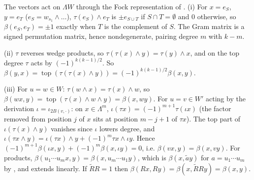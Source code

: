 The vectors act on $\Lambda W$ through the Fock representation of . (i) For $x = e_S$, $y = e_T$ ($e_S = w_{s_1} \wedge \dots$), $\tau(e_S) \wedge e_T$ is $\pm e_{S \cup T}$ if $S \cap T = \emptyset$ and $0$ otherwise, so $\beta(e_S, e_T) = \pm 1$ exactly when $T$ is the complement of $S$. The Gram matrix is a signed permutation matrix, hence nondegenerate, pairing degree $m$ with $k - m$.

(ii) $\tau$ reverses wedge products, so $\tau(\tau(x) \wedge y) = \tau(y) \wedge x$, and on the top degree $\tau$ acts by $(-1)^{k(k-1)/2}$. So $\beta(y, x) = \operatorname{top}(\tau(\tau(x) \wedge y)) = (-1)^{k(k-1)/2}\beta(x, y)$.

(iii) For $u = w \in W$: $\tau(w \wedge x) = \tau(x) \wedge w$, so $\beta(w x, y) = \operatorname{top}(\tau(x) \wedge w \wedge y) = \beta(x, w y)$. For $u = v \in W'$ acting by the derivation $\iota = \iota_{2B(v, \cdot)}$: on $x \in \Lambda^{m}$, $\iota(\tau x) = (-1)^{m+1} \tau(\iota x)$ (the factor removed from position $j$ of $x$ sits at position $m - j + 1$ of $\tau x$). The top part of $\iota(\tau(x) \wedge y)$ vanishes since $\iota$ lowers degree, and $\iota(\tau x \wedge y) = \iota(\tau x) \wedge y + (-1)^{m} \tau x \wedge \iota y$. Hence $(-1)^{m+1}\beta(\iota x, y) + (-1)^{m}\beta(x, \iota y) = 0$, i.e. $\beta(vx, y) = \beta(x, vy)$. For products, $\beta(u_1 \cdots u_m x, y) = \beta(x, u_m \cdots u_1 y)$, which is $\beta(x, \tilde{a} y)$ for $a = u_1 \cdots u_m$ by , and extends linearly. If $\tilde{R} R = 1$ then $\beta(Rx, Ry) = \beta(x, \tilde{R} R y) = \beta(x, y)$.
